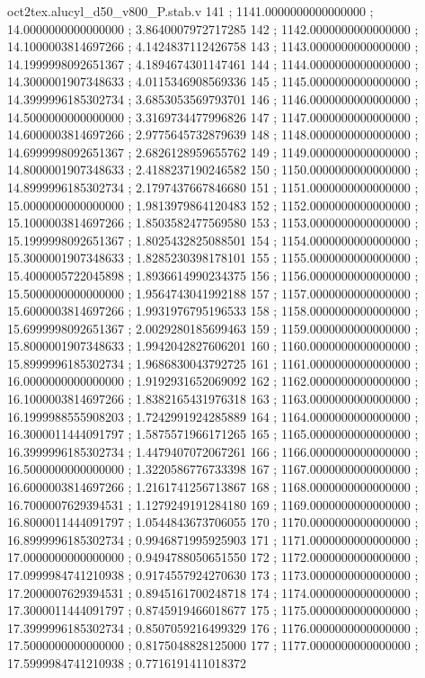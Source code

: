 \begin{filecontents}[overwrite]{oct2tex.alucyl_d50_v800_P.stab.v}
141 ; 1141.0000000000000000 ; 14.0000000000000000 ; 3.8640007972717285
142 ; 1142.0000000000000000 ; 14.1000003814697266 ; 4.1424837112426758
143 ; 1143.0000000000000000 ; 14.1999998092651367 ; 4.1894674301147461
144 ; 1144.0000000000000000 ; 14.3000001907348633 ; 4.0115346908569336
145 ; 1145.0000000000000000 ; 14.3999996185302734 ; 3.6853053569793701
146 ; 1146.0000000000000000 ; 14.5000000000000000 ; 3.3169734477996826
147 ; 1147.0000000000000000 ; 14.6000003814697266 ; 2.9775645732879639
148 ; 1148.0000000000000000 ; 14.6999998092651367 ; 2.6826128959655762
149 ; 1149.0000000000000000 ; 14.8000001907348633 ; 2.4188237190246582
150 ; 1150.0000000000000000 ; 14.8999996185302734 ; 2.1797437667846680
151 ; 1151.0000000000000000 ; 15.0000000000000000 ; 1.9813979864120483
152 ; 1152.0000000000000000 ; 15.1000003814697266 ; 1.8503582477569580
153 ; 1153.0000000000000000 ; 15.1999998092651367 ; 1.8025432825088501
154 ; 1154.0000000000000000 ; 15.3000001907348633 ; 1.8285230398178101
155 ; 1155.0000000000000000 ; 15.4000005722045898 ; 1.8936614990234375
156 ; 1156.0000000000000000 ; 15.5000000000000000 ; 1.9564743041992188
157 ; 1157.0000000000000000 ; 15.6000003814697266 ; 1.9931976795196533
158 ; 1158.0000000000000000 ; 15.6999998092651367 ; 2.0029280185699463
159 ; 1159.0000000000000000 ; 15.8000001907348633 ; 1.9942042827606201
160 ; 1160.0000000000000000 ; 15.8999996185302734 ; 1.9686830043792725
161 ; 1161.0000000000000000 ; 16.0000000000000000 ; 1.9192931652069092
162 ; 1162.0000000000000000 ; 16.1000003814697266 ; 1.8382165431976318
163 ; 1163.0000000000000000 ; 16.1999988555908203 ; 1.7242991924285889
164 ; 1164.0000000000000000 ; 16.3000011444091797 ; 1.5875571966171265
165 ; 1165.0000000000000000 ; 16.3999996185302734 ; 1.4479407072067261
166 ; 1166.0000000000000000 ; 16.5000000000000000 ; 1.3220586776733398
167 ; 1167.0000000000000000 ; 16.6000003814697266 ; 1.2161741256713867
168 ; 1168.0000000000000000 ; 16.7000007629394531 ; 1.1279249191284180
169 ; 1169.0000000000000000 ; 16.8000011444091797 ; 1.0544843673706055
170 ; 1170.0000000000000000 ; 16.8999996185302734 ; 0.9946871995925903
171 ; 1171.0000000000000000 ; 17.0000000000000000 ; 0.9494788050651550
172 ; 1172.0000000000000000 ; 17.0999984741210938 ; 0.9174557924270630
173 ; 1173.0000000000000000 ; 17.2000007629394531 ; 0.8945161700248718
174 ; 1174.0000000000000000 ; 17.3000011444091797 ; 0.8745919466018677
175 ; 1175.0000000000000000 ; 17.3999996185302734 ; 0.8507059216499329
176 ; 1176.0000000000000000 ; 17.5000000000000000 ; 0.8175048828125000
177 ; 1177.0000000000000000 ; 17.5999984741210938 ; 0.7716191411018372

\end{filecontents}
